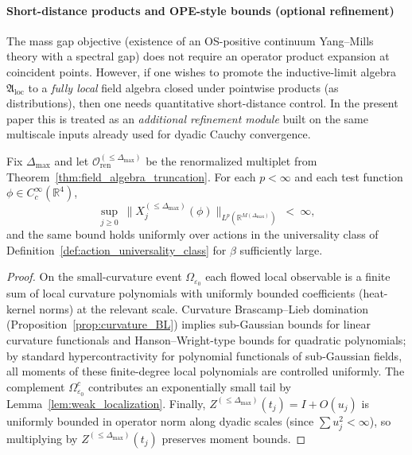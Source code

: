 \paragraph*{Short-distance products and OPE-style bounds (optional refinement)}
\label{subsubsec:ope_bounds}

The mass gap objective (existence of an OS-positive continuum Yang--Mills theory with a spectral gap) does not require an operator product
expansion at coincident points. However, if one wishes to promote the inductive-limit algebra $\mathfrak A_{\mathrm{loc}}$ to a
\emph{fully local} field algebra closed under pointwise products (as distributions), then one needs quantitative short-distance control.
In the present paper this is treated as an \emph{additional refinement module} built on the same multiscale inputs already used for
dyadic Cauchy convergence.

\begin{lemma}
\label{lem:uniform_Lp_moments_trunc}
Fix $\Delta_{\max}$ and let $\mathbf{\mathcal O}^{(\le \Delta_{\max})}_{\mathrm{ren}}$ be the renormalized multiplet from
Theorem~\ref{thm:field_algebra_truncation}.
For each $p<\infty$ and each test function $\phi\in C_c^{\infty}(\mathbb R^4)$,
\[
\sup_{j\ge 0}\ \|X^{(\le\Delta_{\max})}_j(\phi)\|_{L^p(\mathbb R^{M(\Delta_{\max})})}\ <\ \infty,
\]
and the same bound holds uniformly over actions in the universality class of Definition~\ref{def:action_universality_class}
for $\beta$ sufficiently large.
\end{lemma}

\begin{proof}
On the small-curvature event $\Omega_{\varepsilon_0}$ each flowed local observable is a finite sum of local curvature polynomials with
uniformly bounded coefficients (heat-kernel norms) at the relevant scale.
Curvature Brascamp--Lieb domination (Proposition~\ref{prop:curvature_BL}) implies sub-Gaussian bounds for linear curvature functionals and
Hanson--Wright-type bounds for quadratic polynomials; by standard hypercontractivity for polynomial functionals of sub-Gaussian fields,
all moments of these finite-degree local polynomials are controlled uniformly.
The complement $\Omega_{\varepsilon_0}^c$ contributes an exponentially small tail by Lemma~\ref{lem:weak_localization}.
Finally, $Z^{(\le\Delta_{\max})}(t_j)=I+O(u_j)$ is uniformly bounded in operator norm along dyadic scales (since $\sum u_j^2<\infty$),
so multiplying by $Z^{(\le\Delta_{\max})}(t_j)$ preserves moment bounds.
\end{proof}

